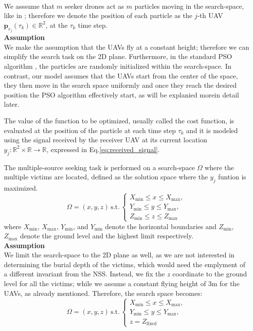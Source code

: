\noindent
\\
We asssume that $m$ seeker drones act as $m$ particles moving in the search-space, 
like in \cite{3}; therefore we denote the position of each particle as the $j$-th UAV
$\mathbf{p}_{r_j}(\tau_k) \in \mathbb{R}^2$, at the $\tau_k$ time step.
\noindent
\\
\textbf{Assumption}
\\
We make the assumption that the UAVs fly at a constant height; therefore we can
simplify the search task on the 2D plane.
Furthermore, in the standard PSO algorithm \cite{PSO_original}, the particles are randomly 
initialized within the search-space. In contrast, our model assumes that the UAVs 
start from the center of the space, they then move in the search space 
uniformly and once they reach the desired position the PSO algorithm
effectively start, as will be explanied morein detail later.

The value of the function to be optimized, usually
called the cost function, is evaluated at the position of the particle at 
each time step $\tau_k$ and it is modeled using the signal 
received by the receiver UAV at its current location
\( y_j : \mathbb{R}^2 
\times \mathbb{R} \rightarrow \mathbb{R} \), expressed in 
Eq.\ref{eq:received_signal}.

The multiple-source seeking task is performed on a search-space $\Omega$ 
where the multiple victims are located, 
defined as the solution space where the $y_j$ funtion is maximized.
\[
\Omega = (x, y, z) \, \text{s.t.} \,
\begin{cases}
    X_{\min} \leq x \leq X_{\max}, \\
    Y_{\min} \leq y \leq Y_{\max}, \\
    Z_{\min} \leq z \leq Z_{\max}
\end{cases}
\]
where $X_{\min}$, $X_{\max}$, $Y_{\min}$, and $Y_{\min}$ denote the horizontal
boundaries and $Z_{\min}$, $Z_{\max}$ denote the ground level and
the highest limit respectively.
\noindent
\\
\textbf{Assumption}
\\
We limit the search-space to the 2D plane as well, as we are not interested
in determining the burial depth of the victims, 
which would need the emplyment of a different 
invariant from the NSS.
Instead, we fix the $z$ coordinate to the ground level for all the victims;
while we assume a constant flying height of 3m for the UAVs, as already mentioned.
Therefore, the search space becomes:
\[
\Omega = (x, y, z) \, \text{s.t.} \,
\begin{cases}
    X_{\min} \leq x \leq X_{\max}, \\
    Y_{\min} \leq y \leq Y_{\max}, \\
    z = Z_{\text{fixed}}
\end{cases}
\]

